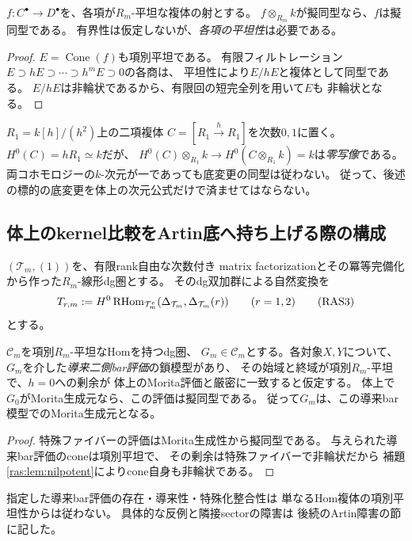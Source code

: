 \begin{lemma}[有限nilpotent比較の検出]\label{ras:lem:nilpotent}
$f:C^\bullet\to D^\bullet$を、各項が$R_m$-平坦な複体の射とする。
$f\otimes_{R_m}k$が擬同型なら、$f$は擬同型である。
有界性は仮定しないが、\emph{各項の平坦性}は必要である。
\end{lemma}
\begin{proof}
$E=\operatorname{Cone}(f)$も項別平坦である。
有限フィルトレーション
$E\supset hE\supset\cdots\supset h^mE\supset0$の各商は、
平坦性により$E/hE$と複体として同型である。
$E/hE$は非輪状であるから、有限回の短完全列を用いて$E$も
非輪状となる。
\end{proof}

\begin{example}[特殊ファイバーの次元だけでは足りない]
\label{ras:ex:basechange-fails}
$R_1=k[h]/(h^2)$上の二項複体
$C=[R_1\xrightarrow{h}R_1]$を次数$0,1$に置く。
$H^0(C)=hR_1\simeq k$だが、
$H^0(C)\otimes_{R_1}k\to H^0(C\otimes_{R_1}k)=k$は\emph{零写像}である。
両コホモロジーの$k$-次元が一であっても底変更の同型は従わない。
従って、後述の標的の底変更を体上の次元公式だけで済ませてはならない。
\end{example}

\subsection{体上のkernel比較をArtin底へ持ち上げる際の構成}

$(\mathcal T_m,(1))$を、有限rank自由な次数付き
matrix factorizationとその冪等完備化から作った$R_m$-線形dg圏とする。
そのdg双加群による自然変換を
\[
 T_{r,m}:=H^0\operatorname{RHom}_{\mathcal T_m^e}
 (\Delta_{\mathcal T_m},\Delta_{\mathcal T_m}(r))
 \qquad(r=1,2)
 \tag{RAS3}\label{ras:eq:target}
\]
とする。

\begin{lemma}[導来bar評価の条件付き持上げ]\label{ras:lem:generator}
$\mathcal C_m$を項別$R_m$-平坦なHomを持つdg圏、
$G_m\in\mathcal C_m$とする。各対象$X,Y$について、
$G_m$を介した\emph{導来二側bar評価}の鎖模型があり、
その始域と終域が項別$R_m$-平坦で、$h=0$への剰余が
体上のMorita評価と厳密に一致すると仮定する。
体上で$G_0$がMorita生成元なら、この評価は擬同型である。
従って$G_m$は、この導来bar模型でのMorita生成元となる。
\end{lemma}
\begin{proof}
特殊ファイバーの評価はMorita生成性から擬同型である。
与えられた導来bar評価のconeは項別平坦で、
その剰余は特殊ファイバーで非輪状だから
補題\ref{ras:lem:nilpotent}によりcone自身も非輪状である。
\end{proof}
\begin{remark}[一般の特殊生成子持上げは偽]
指定した導来bar評価の存在・導来性・特殊化整合性は
単なるHom複体の項別平坦性からは従わない。
具体的な反例と隣接sectorの障害は
後続のArtin障害の節に記した。
\end{remark}

